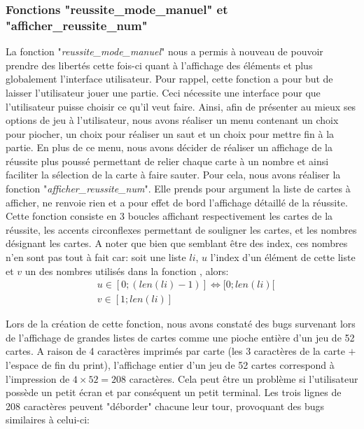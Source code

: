 \documentclass[10pt,a4paper,french,titlepage]{article}
\theoremstyle{definition}
\begin{document}
\subsubsection{Fonctions "reussite\_mode\_manuel" et "afficher\_reussite\_num"}\label{fctreu}
La fonction "\textit{reussite\_mode\_manuel}" nous a permis à nouveau de pouvoir prendre des libertés cette fois-ci quant à l'affichage des éléments et plus globalement l'interface utilisateur. Pour rappel, cette fonction a pour but de laisser l'utilisateur jouer une partie. Ceci nécessite une interface pour que l'utilisateur puisse choisir ce qu'il veut faire. Ainsi, afin de présenter au mieux ses options de jeu à l'utilisateur, nous avons réaliser un menu contenant un choix pour piocher, un choix pour réaliser un saut et un choix pour mettre fin à la partie. En plus de ce menu, nous avons décider de réaliser un affichage de la réussite plus poussé permettant de relier chaque carte à un nombre et ainsi faciliter la sélection de la carte à faire sauter. 
Pour cela, nous avons réaliser la fonction "\textit{afficher\_reussite\_num}". Elle prends pour argument la liste de cartes à afficher, ne renvoie rien et a pour effet de bord l'affichage détaillé de la réussite. Cette fonction consiste en 3 boucles affichant respectivement les cartes de la réussite, les
accents circonflexes permettant de souligner les cartes, et les nombres désignant les cartes. A noter que bien que semblant être des index, ces nombres n'en sont pas tout à fait car: soit une liste $li$, $u$ l'index d'un élément de cette liste et $v$ un des nombres utilisés dans la fonction , alors:
\begin{align*}
	&u \in [0;(len(li)-1)] \iff [0;len(li)[\\
	&v \in [1;len(li)]
\end{align*}

Lors de la création de cette fonction, nous avons constaté des bugs survenant lors de l'affichage de grandes listes de cartes comme une pioche entière d'un jeu de 52 cartes. A raison de 4 caractères imprimés par carte (les 3 caractères de la carte $+$ l'espace de fin du print), l'affichage entier d'un jeu de 52 cartes correspond à l'impression de $4\times52=208$ caractères. Cela peut être un problème si l'utilisateur possède un petit écran et par conséquent un petit terminal. Les trois lignes de 208 caractères peuvent "déborder" chacune leur tour, provoquant des bugs similaires à celui-ci: \\\\
\end{document}
